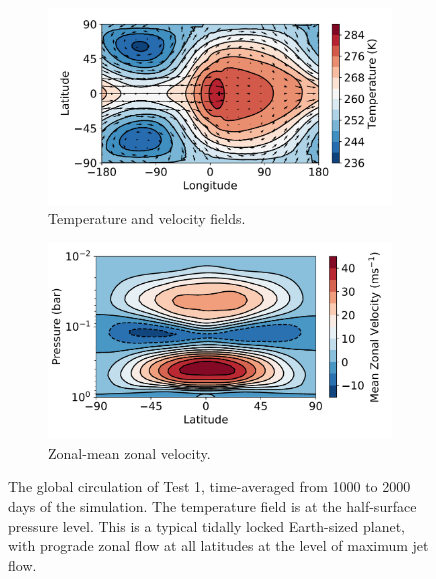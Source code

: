 \begin{figure}
  \centering
  \begin{subfigure}[t]{0.48\textwidth}
    \includegraphics[width=1.0\textwidth]{figures/eqm-zonal-flow/default-gcm-temp.pdf}
    \caption{Temperature and velocity fields.}\label{fig:default-gcm-temp}
  \end{subfigure}
\quad
  \begin{subfigure}[t]{0.48\textwidth}
    \includegraphics[width=1.0\textwidth]{figures/eqm-zonal-flow/default-gcm-zonal-flow.pdf}
    \caption{Zonal-mean zonal velocity.}\label{default-gcm-zonal-flow}
  \end{subfigure}
  \caption{The global circulation of Test 1, time-averaged from 1000 to 2000 days of the simulation. The temperature field is at the half-surface pressure level. This is a typical tidally locked Earth-sized planet, with prograde zonal flow at all latitudes at the level of maximum jet flow.}\label{fig:default-gcm-example}
\end{figure}


